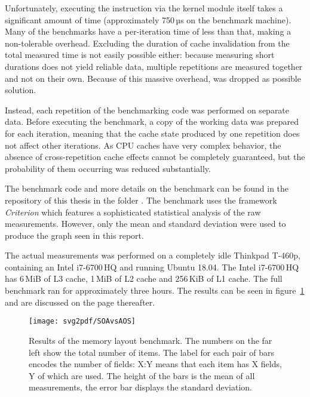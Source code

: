 Unfortunately, executing the instruction via the kernel module itself takes a significant amount of time (approximately 750\,µs on the benchmark machine).
Many of the benchmarks have a per-iteration time of less than that, making  a non-tolerable overhead.
Excluding the duration of cache invalidation from the total measured time is not easily possible either:
because measuring short durations does not yield reliable data, multiple repetitions are measured together and not on their own.
Because of this massive overhead,  was dropped as possible solution.

Instead, each repetition of the benchmarking code was performed on separate data.
Before executing the benchmark, a copy of the working data was prepared for each iteration, meaning that the cache state produced by one repetition does not affect other iterations.
As CPU caches have very complex behavior, the absence of cross-repetition cache effects cannot be completely guaranteed, but the probability of them occurring was reduced substantially.

The benchmark code and more details on the benchmark can be found in the repository of this thesis in the folder .
The benchmark uses the framework \emph{Criterion} \cite{criterion} which features a sophisticated statistical analysis of the raw measurements.
However, only the mean and standard deviation were used to produce the graph seen in this report.

The actual measurements was performed on a completely idle \textsf{Thinkpad T-460p}, containing an \textsf{Intel i7-6700\,HQ} and running \textsf{Ubuntu 18.04}.
The \textsf{Intel i7-6700\,HQ} has 6\,MiB of L3 cache, 1\,MiB of L2 cache and 256\,KiB of L1 cache.
The full benchmark ran for approximately three hours.
The results can be seen in figure~\ref{fig:memory-layout-bench} and are discussed on the page thereafter.


\begin{figure}[p]
  \centering
  \vspace{-7mm}
  \centerline{
    \texttt{[image: svg2pdf/SOAvsAOS]}
  }
  \caption{
    Results of the memory layout benchmark.
    The numbers on the far left show the total number of items.
    The label for each pair of bars encodes the number of fields: \textsf{X:Y} means that each item has \textsf{X} fields, \textsf{Y} of which are used.
    The height of the bars is the mean of all measurements, the error bar displays the standard deviation.
  }
  \label{fig:memory-layout-bench}
\end{figure}
\newpage

